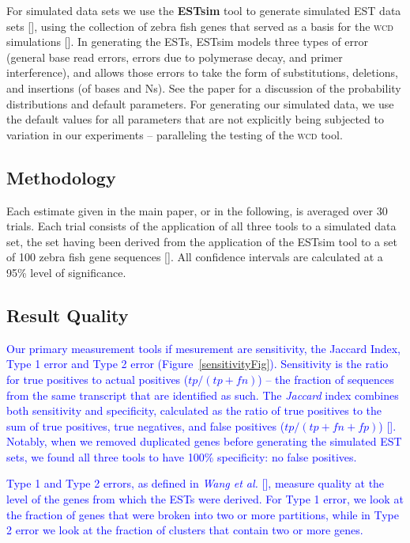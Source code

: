 \documentclass[a4paper,12pt]{article}
\newcommand{\mc}[1]{\textcolor{blue}{#1}}
\begin{document}
\begin{appendix}
For simulated data sets we use the {\bf ESTsim} tool to generate
simulated EST data sets [\cite{Hazelhurst03}], using the collection of
zebra fish genes that served as a basis for the \textsc{wcd} simulations
[\cite{Hazelhurst08a}].  In generating the ESTs, ESTsim models three
types of error (general base read errors, errors due to
polymerase decay, and primer interference), and allows those errors to
take the form of substitutions, deletions, and insertions (of bases
and Ns).  See the paper for a discussion of the probability
distributions and default parameters.  For generating our simulated
data, we use the default values for all parameters that are not
explicitly being subjected to variation in our experiments --
paralleling the testing of the \textsc{wcd} tool.



\subsection{Methodology} 

Each estimate given in the main paper, or in the following, is
averaged over 30 trials.  Each trial consists of the application of
all three tools to a simulated data set, the set having been derived
from the application of the ESTsim tool to a set of 100 zebra fish
gene sequences [\cite{Hazelhurst03}].  All confidence intervals are
calculated at a 95\% level of significance.

\subsection{Result Quality}

\mc{ Our primary measurement tools if mesurement are sensitivity, the
Jaccard Index, Type 1 error and Type 2 error
(Figure~\ref{sensitivityFig}).  Sensitivity is the ratio for true
positives to actual positives ($tp / (tp + fn)$) -- the fraction of
sequences from the same transcript that are identified as such.  The
{\it Jaccard} index combines both sensitivity and specificity,
calculated as the ratio of true positives to the sum of true
positives, true negatives, and false positives ($tp / (tp+fn+fp)$)
[\cite{Hazelhurst08a}].  Notably, when we removed duplicated genes
before generating the simulated EST sets, we found all three tools to
have 100\% specificity: no false positives. }

\mc{Type 1 and Type 2 errors, as defined in {\it Wang et al.}
[\cite{Wang04}], measure quality at the level of the genes from which
the ESTs were derived.  For Type 1 error, we look at the fraction of genes
that were broken into two or more partitions, while in
Type 2 error we look at the fraction of clusters that contain two or
more genes.   }


\end{appendix}
\end{document}
